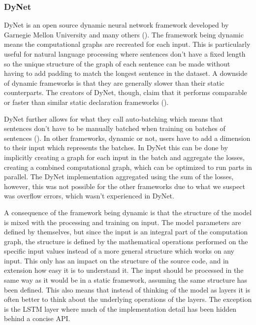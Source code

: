 \subsubsection*{DyNet}\label{sec:setup-implementations-dynet}

DyNet is an open source dynamic neural network framework developed by Garnegie
Mellon University and many others (\cite{dynet-git}). The framework being
dynamic means the computational graphs are recreated for each input. This is
particularly useful for natural language processing where sentences don't have a
fixed length so the unique structure of the graph of each sentence can be made
without having to add padding to match the longest sentence in the dataset. A
downside of dynamic frameworks is that they are generally slower than their
static counterparts. The creators of DyNet, though, claim that it performs
comparable or faster than similar static declaration frameworks (\cite{dynet}).   

DyNet further allows for what they call auto-batching which means that sentences
don't have to be manually batched when training on batches of
sentences (\cite{autobatching}). In other frameworks, dynamic or not, users have
to add a dimension to their input which represents the batches. In DyNet this
can be done by implicitly creating a graph for each input in the batch and
aggregate the losses, creating a combined computational graph, which can be
optimized to run parts in parallel. The DyNet implementation aggregated using
the sum of the losses, however, this was not possible for the other frameworks
due to what we suspect was overflow errors, which wasn't experienced in DyNet. 

A consequence of the framework being dynamic is that the structure of the model
is mixed with the processing and training on input. The model parameters are
defined by themselves, but since the input is an integral part of the
computation graph, the structure is defined by the mathematical operations
performed on the specific input values instead of a more general structure which
works on any input. This only has an impact on the structure of the source code,
and in extension how easy it is to understand it. The input should be processed
in the same way as it would be in a static framework, assuming the same
structure has been defined. This also means that instead of thinking of the
model as layers it is often better to think about the underlying operations of
the layers. The exception is the LSTM layer where much of the
implementation detail has been hidden behind a concise API.

